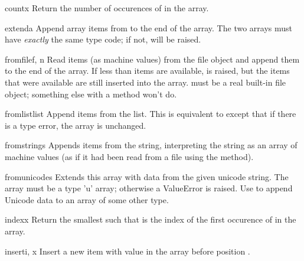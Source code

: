 \begin{methoddesc}[array]{count}{x}
Return the number of occurences of  in the array.
\end{methoddesc}

\begin{methoddesc}[array]{extend}{a}
Append array items from  to the end of the array.  The two
arrays must have \emph{exactly} the same type code; if not,
 will be raised.
\end{methoddesc}

\begin{methoddesc}[array]{fromfile}{f, n}
Read  items (as machine values) from the file object 
and append them to the end of the array.  If less than  items
are available,  is raised, but the items that were
available are still inserted into the array.   must be a real
built-in file object; something else with a  method won't
do.
\end{methoddesc}

\begin{methoddesc}[array]{fromlist}{list}
Append items from the list.  This is equivalent to
except that if there is a type error, the array is unchanged.
\end{methoddesc}

\begin{methoddesc}[array]{fromstring}{s}
Appends items from the string, interpreting the string as an
array of machine values (as if it had been read from a
file using the  method).
\end{methoddesc}

\begin{methoddesc}[array]{fromunicode}{s}
Extends this array with data from the given unicode string.
The array must be a type 'u' array; otherwise a ValueError
is raised.  Use  to
append Unicode data to an array of some other type.
\end{methoddesc}

\begin{methoddesc}[array]{index}{x}
Return the smallest  such that  is the index of
the first occurence of  in the array.
\end{methoddesc}

\begin{methoddesc}[array]{insert}{i, x}
Insert a new item with value  in the array before position
.
\end{methoddesc}

